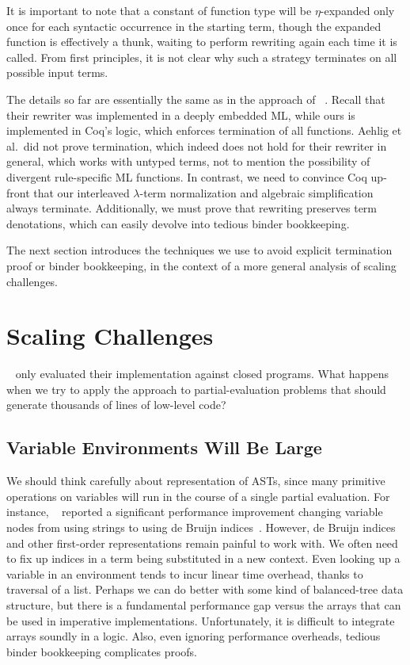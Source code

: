 \documentclass[sn-mathphys,pdflatex]{sn-jnl}%
\newcommand{\citetfield}[1]{\usebibentry{#1}{citet}~\cite{#1}}
\theoremstyle{thmstyleone}%
\theoremstyle{thmstyletwo}%
\theoremstyle{thmstylethree}%
\begin{document}
It is important to note that a constant of function type will be $\eta$-expanded only once for each syntactic occurrence in the starting term, though the expanded function is effectively a thunk, waiting to perform rewriting again each time it is called.
From first principles, it is not clear why such a strategy terminates on all possible input terms.

The details so far are essentially the same as in the approach of \citetfield{Aehlig}.
Recall that their rewriter was implemented in a deeply embedded ML, while ours is implemented in Coq's logic, which enforces termination of all functions.
Aehlig et al.\ did not prove termination, which indeed does not hold for their rewriter in general, which works with untyped terms, not to mention the possibility of divergent rule-specific ML functions.
In contrast, we need to convince Coq up-front that our interleaved $\lambda$-term normalization and algebraic simplification always terminate.
Additionally, we must prove that rewriting preserves term denotations, which can easily devolve into tedious binder bookkeeping.

The next section introduces the techniques we use to avoid explicit termination proof or binder bookkeeping, in the context of a more general analysis of scaling challenges.


\section{Scaling Challenges}\label{sec:scaling}

\citetfield{Aehlig} only evaluated their implementation against closed programs.
What happens when we try to apply the approach to partial-evaluation problems that should generate thousands of lines of low-level code?

\subsection{Variable Environments Will Be Large}\label{sec:PHOAS}
We should think carefully about representation of ASTs, since many primitive operations on variables will run in the course of a single partial evaluation.
For instance, \citetfield{Aehlig} reported a significant performance improvement changing variable nodes from using strings to using de Bruijn indices~\cite{debruijn1972}.
However, de Bruijn indices and other first-order representations remain painful to work with.
We often need to fix up indices in a term being substituted in a new context.
Even looking up a variable in an environment tends to incur linear time overhead, thanks to traversal of a list.
Perhaps we can do better with some kind of balanced-tree data structure, but there is a fundamental performance gap versus the arrays that can be used in imperative implementations.
Unfortunately, it is difficult to integrate arrays soundly in a logic.
Also, even ignoring performance overheads, tedious binder bookkeeping complicates proofs.
\end{document}
